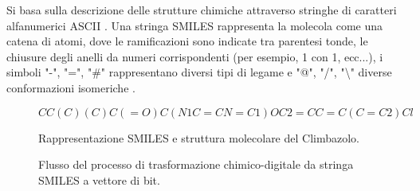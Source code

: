 Si basa sulla descrizione delle strutture chimiche attraverso stringhe di caratteri alfanumerici ASCII \cite{aksamitHybridFragmentSMILESTokenization2024}. %
Una stringa SMILES rappresenta la molecola come una catena di atomi, dove le ramificazioni sono indicate tra parentesi tonde, le chiusure degli anelli da numeri corrispondenti (per esempio, 1 con 1, ecc...), i simboli "-", "=", "\#" \cite{sadeghiCanLargeLanguage2024} rappresentano diversi tipi di legame e "@", "/", "\textbackslash" diverse conformazioni isomeriche \cite{aksamitHybridFragmentSMILESTokenization2024}.
\begin{figure}[htbp]
    \centering
    $$CC(C)(C)C(=O)C(N1C=CN=C1)OC2=CC=C(C=C2)Cl$$
    \caption{Rappresentazione SMILES e struttura molecolare del Climbazolo.}
    \label{fig:climbazolo_smiles}
\end{figure}
\begin{figure}[h]
    \centering
    \caption{Flusso del processo di trasformazione chimico-digitale da stringa SMILES a vettore di bit.}
    \label{fig:smiles_to_bits_vertical}
\end{figure}

